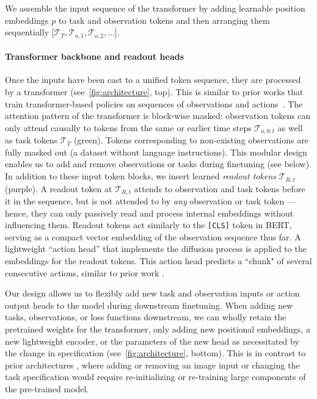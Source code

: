 We assemble the input sequence of the transformer by adding learnable position embeddings $p$ to task and observation tokens and then arranging them sequentially $\big[\mathcal{T}_T, \mathcal{T}_{o,1}, \mathcal{T}_{o,2}, \dots\big]$.

\paragraph{Transformer backbone and readout heads} Once the inputs have been cast to a unified token sequence, they are processed by a transformer (see~\cref{fig:architecture}, top). This is similar to prior works that train transformer-based policies on sequences of observations and actions~\citep{wu2023masked,radosavovic2023robot}. The attention pattern of the \method{} transformer is block-wise masked: observation tokens can only attend causally to tokens from the same or earlier time steps $\mathcal{T}_{o, 0:t}$ as well as task tokens $\mathcal{T}_T$ (green). Tokens corresponding to non-existing observations are fully masked out (\eg a dataset without language instructions). This modular design enables us to add and remove observations or tasks during finetuning (see below). In addition to these input token blocks, we insert learned \emph{readout tokens} $\mathcal{T}_{R,t}$ (purple). A readout token at $\mathcal{T}_{R,t}$ attends to observation and task tokens before it in the sequence, but is not attended to by \textit{any} observation or task token --- hence, they can only passively read and process internal embeddings without influencing them. Readout tokens act similarly to the \texttt{[CLS]} token in BERT, serving as a compact vector embedding of the observation sequence thus far. A lightweight ``action head'' that implements the diffusion process is applied to the embeddings for the readout tokens. This action head predicts a ``chunk" of several consecutive actions, similar to prior work \cite{zhao2023learning, chi2023diffusionpolicy}. 

Our design allows us to flexibly add new task and observation inputs or action output heads to the model during downstream finetuning. When adding new tasks, observations, or loss functions downstream, we can wholly retain the pretrained weights for the transformer, only adding new positional embeddings, a new lightweight encoder, or the parameters of the new head as necessitated by the change in specification (see~\cref{fig:architecture}, bottom). This is in contrast to prior architectures \citep{brohan2022rt, shah2023vint}, where adding or removing an image input or changing the task specification would require re-initializing or re-training large components of the pre-trained model.

